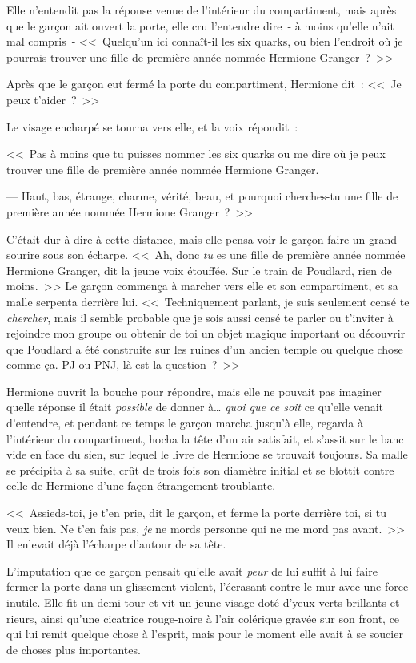Elle n'entendit pas la réponse venue de l'intérieur du compartiment, mais après que le garçon ait ouvert la porte, elle cru l'entendre dire~- à moins qu'elle n'ait mal compris~- <<~Quelqu'un ici connaît-il les six quarks, ou bien l'endroit où je pourrais trouver une fille de première année nommée Hermione Granger~?~>>

Après que le garçon eut fermé la porte du compartiment, Hermione dit~: <<~Je peux t'aider~?~>>

Le visage encharpé se tourna vers elle, et la voix répondit~:

<<~Pas à moins que tu puisses nommer les six quarks ou me dire où je peux trouver une fille de première année nommée Hermione Granger.

--- Haut, bas, étrange, charme, vérité, beau, et pourquoi cherches-tu une fille de première année nommée Hermione Granger~?~>>

C'était dur à dire à cette distance, mais elle pensa voir le garçon faire un grand sourire sous son écharpe. <<~Ah, donc \emph{tu} es une fille de première année nommée Hermione Granger, dit la jeune voix étouffée. Sur le train de Poudlard, rien de moins.~>> Le garçon commença à marcher vers elle et son compartiment, et sa malle serpenta derrière lui. <<~Techniquement parlant, je suis seulement censé te \emph{chercher}, mais il semble probable que je sois aussi censé te parler ou t'inviter à rejoindre mon groupe ou obtenir de toi un objet magique important ou découvrir que Poudlard a été construite sur les ruines d'un ancien temple ou quelque chose comme ça. PJ ou PNJ, là est la question~?~>>

Hermione ouvrit la bouche pour répondre, mais elle ne pouvait pas imaginer quelle réponse il était \emph{possible} de donner à… \emph{quoi que ce soit} ce qu'elle venait d'entendre, et pendant ce temps le garçon marcha jusqu'à elle, regarda à l'intérieur du compartiment, hocha la tête d'un air satisfait, et s'assit sur le banc vide en face du sien, sur lequel le livre de Hermione se trouvait toujours. Sa malle se précipita à sa suite, crût de trois fois son diamètre initial et se blottit contre celle de Hermione d'une façon étrangement troublante.

<<~Assieds-toi, je t'en prie, dit le garçon, et ferme la porte derrière toi, si tu veux bien. Ne t'en fais pas, \emph{je} ne mords personne qui ne me mord pas avant.~>> Il enlevait déjà l'écharpe d'autour de sa tête.

L'imputation que ce garçon pensait qu'elle avait \emph{peur} de lui suffit à lui faire fermer la porte dans un glissement violent, l'écrasant contre le mur avec une force inutile. Elle fit un demi-tour et vit un jeune visage doté d'yeux verts brillants et rieurs, ainsi qu'une cicatrice rouge-noire à l'air colérique gravée sur son front, ce qui lui remit quelque chose à l'esprit, mais pour le moment elle avait à se soucier de choses plus importantes.

